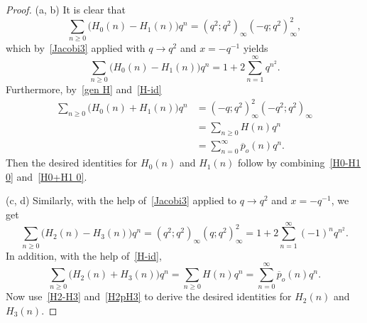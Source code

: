 \documentclass{amsart}
\numberwithin{equation}{section}
\theoremstyle{definition}
\newcommand{\fr}{\frac}
\begin{document}
%
\begin{proof}
(a, b) It is clear that
\begin{equation*}
\sum_{n\geq 0} \big(H_0(n)-H_1(n)\big) q^n = (q^2;q^2)_\infty (-q;q^2)_\infty^2,
\end{equation*}
which by~\eqref{Jacobi3} applied with $q\to q^2$ and $x=-q^{-1}$ yields
\begin{equation}\label{H0-H1 0}
\sum_{n\geq 0} \big(H_0(n)-H_1(n)\big) q^n = 1+2\sum_{n=1}^{\infty}q^{n^2}.
\end{equation}
%
Furthermore, by~\eqref{gen H} and~\eqref{H-id}
\begin{align}
\sum_{n\geq 0} \big(H_0(n)+H_1(n)\big) q^n
&= (-q;q^2)_\infty^2 (-q^2;q^2)_\infty \nonumber \\
&= \sum_{n\geq 0} H(n) q^n \nonumber \\
&=\sum_{n=0}^{\infty} \overline{p}_o(n) q^n. \label{H0+H1 0}
\end{align}
Then the desired identities for $H_0(n)$ and $H_1(n)$ follow by combining~\eqref{H0-H1 0} and~\eqref{H0+H1 0}.

(c, d) Similarly, with the help of~\eqref{Jacobi3} applied to $q\to q^2$ and $x=-q^{-1}$, we get
\begin{equation}\label{H2-H3}
\sum_{n\geq 0} \big(H_2(n)-H_3(n)\big) q^n = (q^2;q^2)_\infty (q;q^2)_\infty^2
=1+2\sum_{n=1}^{\infty}(-1)^n q^{n^2}.
\end{equation}
In addition, with the help of~\eqref{H-id},
\begin{equation}\label{H2pH3}
\sum_{n\geq 0} \big(H_2(n)+H_3(n)\big) q^n
= \sum_{n\geq 0} H(n) q^n = \sum_{n=0}^\infty \overline{p}_o(n) q^n.
\end{equation}
Now use~\eqref{H2-H3} and~\eqref{H2pH3}
to derive the desired identities for $H_2(n)$ and $H_3(n)$.
\end{proof}
%
\end{document}
